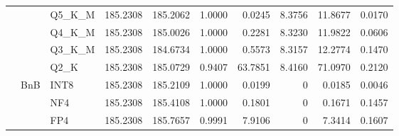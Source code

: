 \begin{table}[t]
{\begin{tabular}{ll l rrrrrrr}
 &  & Q5\_K\_M & 185.2308 & 185.2062 & 1.0000 & 0.0245 & 8.3756 & 11.8677 & 0.0170 \\
 &  & Q4\_K\_M & 185.2308 & 185.0026 & 1.0000 & 0.2281 & 8.3230 & 11.9822 & 0.0606 \\
 &  & Q3\_K\_M & 185.2308 & 184.6734 & 1.0000 & 0.5573 & 8.3157 & 12.2774 & 0.1470 \\
 &  & Q2\_K & 185.2308 & 185.0729 & \cellcolor{red!18} 0.9407 & \cellcolor{red!18} 63.7851 & 8.4160 & \cellcolor{red!18} 71.0970 & \cellcolor{red!18} 0.2120 \\
 & BnB & INT8 & 185.2308 & 185.2109 & 1.0000 & 0.0199 & \cellcolor{cyan!12} $0$ & 0.0185 & 0.0046 \\
 &  & NF4 & 185.2308 & 185.4108 & 1.0000 & 0.1801 & \cellcolor{cyan!12} $0$ & 0.1671 & 0.1457 \\
 &  & FP4 & 185.2308 & 185.7657 & 0.9991 & 7.9106 & \cellcolor{cyan!12} $0$ & 7.3414 & 0.1607 \\
\bottomrule
\end{tabular}}
\end{table}